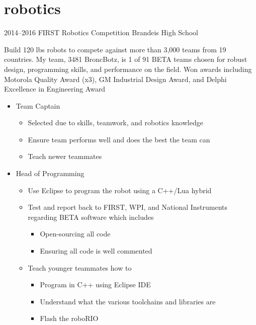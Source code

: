 \documentclass[]{friggeri-cv} %
\begin{document}

\pagebreak 

\section{robotics}

\begin{entrylist}

	\entry
	{2014--2016}
	{FIRST Robotics Competition}
	{Brandeis High School}
	{Build 120 lbs robots to compete against more than 3,000 teams from 19 countries. My team, 3481 BroncBotz, is 1 of 91 BETA teams chosen for robust design, programming skills, and performance on the field. Won awards including Motorola Quality Award (x3), GM Industrial Design Award, and Delphi Excellence in Engineering Award
		\begin{itemize}
			\item Team Captain
				\begin{itemize}
					\item Selected due to skills, teamwork, and robotics knowledge
					\item Ensure team performs well and does the best the team can
					\item Teach newer teammates
				\end{itemize}
			\item Head of Programming
				\begin{itemize}
					\item Use Eclipse to program the robot using a C++/Lua hybrid
					\item Test and report back to FIRST, WPI, and National Instruments regarding BETA software which includes
						\begin{itemize}
							\item Open-sourcing all code
							\item Ensuring all code is well commented
						\end{itemize}
					\item Teach younger teammates how to
						\begin{itemize}
							\item Program in C++ using Eclipse IDE
							\item Understand what the various toolchains and libraries are
							\item Flash the roboRIO

\end{itemize}
\end{itemize}
\end{itemize}}
\end{entrylist}
\end{document}
